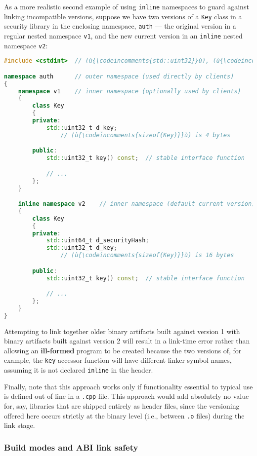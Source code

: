 As a more realistic second example of using \texttt{inline} namespaces
to guard against linking incompatible versions, suppose we have two
versions of a \texttt{Key} class in a security library in the enclosing
namespace, \texttt{auth} --- the original version in a regular nested
namespace \texttt{v1}, and the new current version in an \texttt{inline}
nested namespace \texttt{v2}:

\begin{lstlisting}[language=C++]
#include <cstdint>  // (ù{\codeincomments{std::uint32}}ù), (ù{\codeincomments{std::unit64}}ù)

namespace auth      // outer namespace (used directly by clients)
{
    namespace v1    // inner namespace (optionally used by clients)
    {
        class Key
        {
        private:
            std::uint32_t d_key;
                // (ù{\codeincomments{sizeof(Key)}}ù) is 4 bytes

        public:
            std::uint32_t key() const;  // stable interface function

            // ...
        };
    }

    inline namespace v2    // inner namespace (default current version)
    {
        class Key
        {
        private:
            std::uint64_t d_securityHash;
            std::uint32_t d_key;
                // (ù{\codeincomments{sizeof(Key)}}ù) is 16 bytes

        public:
            std::uint32_t key() const;  // stable interface function

            // ...
        };
    }
}
\end{lstlisting}
    
\noindent Attempting to link together older binary artifacts built against version
1 with binary artifacts built against version 2 will result in a
link-time error rather than allowing an \textbf{ill-formed} program to
be created because the two versions of, for example, the \texttt{key}
accessor function will have different linker-symbol names, assuming it
is not declared \texttt{inline} in the header.

Finally, note that this approach works only if functionality essential
to typical use is defined out of line in a \texttt{.cpp} file. This
approach would add absolutely no value for, say, libraries that are
shipped entirely as header files, since the versioning offered here
occurs strictly at the binary level (i.e., between \texttt{.o} files)
during the link stage.

\subsubsection[Build modes and ABI link safety]{Build modes and ABI link safety}\label{build-modes-and-abi-link-safety}

